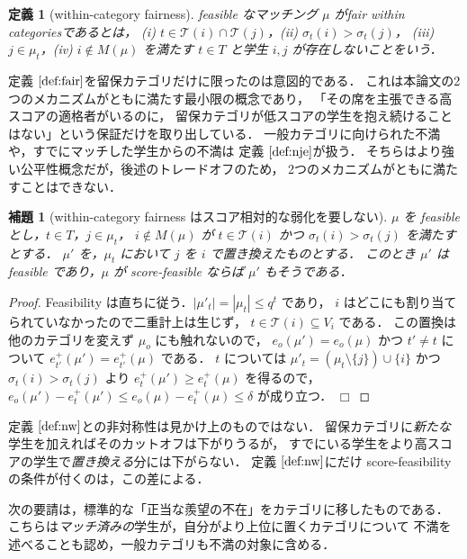 \documentclass[
    12pt,          %
    a4paper,       %
    oneside,       %
    onecolumn,     %
    titlepage,     %
    final          %
]{jreport} %
\newcommand{\refdefinition}[1]{定義 $\ref{#1}$}
\newtheorem{definition}{定義}[chapter]
\newtheorem{lemma}{補題}[chapter]
\newtheorem{proof}{証明}[chapter]
\newcommand{\qed}{\hfill $\Box$ \par}
\renewcommand{\T}{\mathcal{T}}   %
\begin{document}
\begin{definition}[within-category fairness]
\label{def:fair}
feasible なマッチング $\mu$ が\emph{fair within categories}であるとは，
(i) $t\in\T(i)\cap\T(j)$，(ii) $\sigma_t(i)>\sigma_t(j)$，
(iii) $j\in\mu_t$，(iv) $i\notin M(\mu)$
を満たす $t\in T$ と学生 $i,j$ が存在しないことをいう．
\end{definition}

\refdefinition{def:fair}を留保カテゴリだけに限ったのは意図的である．
これは本論文の2つのメカニズムがともに満たす最小限の概念であり，
「その席を主張できる高スコアの適格者がいるのに，
留保カテゴリが低スコアの学生を抱え続けることはない」という保証だけを取り出している．
一般カテゴリに向けられた不満や，すでにマッチした学生からの不満は
\refdefinition{def:nje}が扱う．
そちらはより強い公平性概念だが，後述のトレードオフのため，
2つのメカニズムがともに満たすことはできない．

\begin{lemma}[within-category fairness はスコア相対的な弱化を要しない]
\label{lem:fair-sf}
$\mu$ を feasible とし，$t\in T$，$j\in\mu_t$，
$i\notin M(\mu)$ が $t\in\T(i)$ かつ $\sigma_t(i)>\sigma_t(j)$ を満たすとする．
$\mu'$ を，$\mu_t$ において $j$ を $i$ で置き換えたものとする．
このとき $\mu'$ は feasible であり，$\mu$ が score-feasible ならば $\mu'$ もそうである．
\end{lemma}

\begin{proof}
Feasibility は直ちに従う．$|\mu'_t|=|\mu_t|\le q^t$ であり，
$i$ はどこにも割り当てられていなかったので二重計上は生じず，
$t\in\T(i)\subseteq V_i$ である．
この置換は他のカテゴリを変えず $\mu_o$ にも触れないので，
$e_o(\mu')=e_o(\mu)$ かつ $t'\neq t$ について $e_{t'}^+(\mu')=e_{t'}^+(\mu)$ である．
$t$ については $\mu'_t=(\mu_t\setminus\{j\})\cup\{i\}$ かつ $\sigma_t(i)>\sigma_t(j)$ より
$e_t^+(\mu')\ge e_t^+(\mu)$ を得るので，
$e_o(\mu')-e_t^+(\mu')\le e_o(\mu)-e_t^+(\mu)\le\delta$ が成り立つ．
\qed
\end{proof}

\refdefinition{def:nw}との非対称性は見かけ上のものではない．
留保カテゴリに\emph{新たな}学生を加えればそのカットオフは下がりうるが，
すでにいる学生をより高スコアの学生で\emph{置き換える}分には下がらない．
\refdefinition{def:nw}にだけ score-feasibility の条件が付くのは，この差による．

次の要請は，標準的な「正当な羨望の不在」をカテゴリに移したものである．
こちらは\emph{マッチ済みの}学生が，自分がより上位に置くカテゴリについて
不満を述べることも認め，一般カテゴリも不満の対象に含める．
\end{document}
